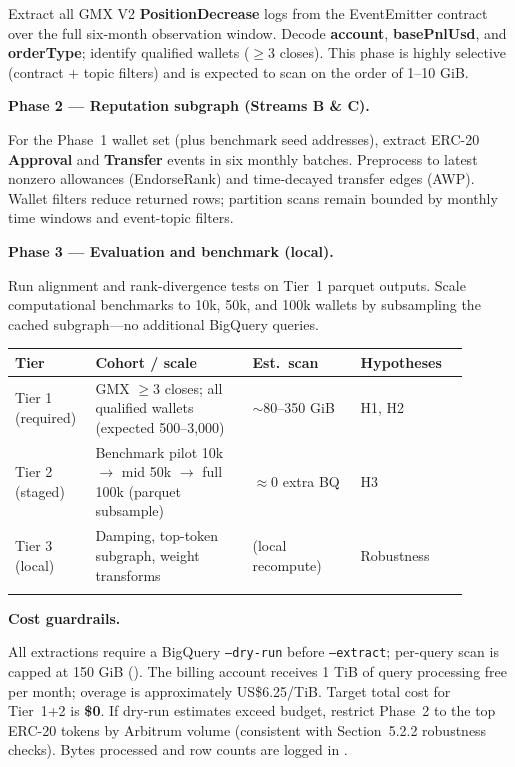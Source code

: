 Extract all GMX V2 \textbf{PositionDecrease} logs from the EventEmitter contract over the full six-month observation window. Decode \textbf{account}, \textbf{basePnlUsd}, and \textbf{orderType}; identify qualified wallets ($\geq 3$ closes). This phase is highly selective (contract + topic filters) and is expected to scan on the order of 1--10 GiB.


\textbf{Phase 2 --- Reputation subgraph (Streams B \& C).}


For the Phase~1 wallet set (plus benchmark seed addresses), extract ERC-20 \textbf{Approval} and \textbf{Transfer} events in six monthly batches. Preprocess to latest nonzero allowances (EndorseRank) and time-decayed transfer edges (AWP). Wallet filters reduce returned rows; partition scans remain bounded by monthly time windows and event-topic filters.


\textbf{Phase 3 --- Evaluation and benchmark (local).}


Run alignment and rank-divergence tests on Tier~1 parquet outputs. Scale computational benchmarks to 10k, 50k, and 100k wallets by subsampling the cached subgraph---no additional BigQuery queries.


\begin{longtable}{>{\raggedright\arraybackslash}p{0.14\linewidth}>{\raggedright\arraybackslash}p{0.32\linewidth}>{\raggedright\arraybackslash}p{0.22\linewidth}>{\raggedright\arraybackslash}p{0.22\linewidth}}
\toprule
\textbf{Tier} & \textbf{Cohort / scale} & \textbf{Est.\ scan} & \textbf{Hypotheses} \\
\midrule
Tier 1 (required) & GMX $\geq 3$ closes; all qualified wallets (expected 500--3,000) & $\sim$80--350 GiB & H1, H2 \\
Tier 2 (staged) & Benchmark pilot 10k $\to$ mid 50k $\to$ full 100k (parquet subsample) & $\approx 0$ extra BQ & H3 \\
Tier 3 (local) & Damping, top-token subgraph, weight transforms & 0 (local recompute) & Robustness \\
\addlinespace
\bottomrule
\end{longtable}


\textbf{Cost guardrails.}


All extractions require a BigQuery \texttt{--dry-run} before \texttt{--extract}; per-query scan is capped at 150 GiB (). The billing account receives 1 TiB of query processing free per month; overage is approximately US\$6.25/TiB. Target total cost for Tier~1+2 is \textbf{\$0}. If dry-run estimates exceed budget, restrict Phase~2 to the top ERC-20 tokens by Arbitrum volume (consistent with Section~5.2.2 robustness checks). Bytes processed and row counts are logged in .


